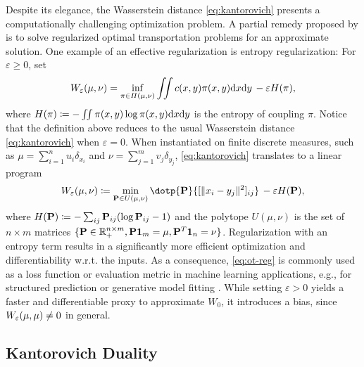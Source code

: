 Despite its elegance, the Wasserstein distance \eqref{eq:kantorovich} presents a computationally challenging optimization problem. A partial remedy proposed by \citet{cuturi2013sinkhorn} is to solve regularized optimal transportation problems for an approximate solution. One example of an effective regularization is entropy regularization: For $\varepsilon\geq0$, set 
\begin{equation} \label{eq:ot-entropy}
W_{\varepsilon}(\mu,\nu) = \inf_{\pi\in \Pi(\mu,\nu)}\iint c(x, y) \pi(x, y)\mathrm{d}x\mathrm{d}y  \,-\varepsilon H(\pi),
\end{equation}
where $H(\pi) \coloneqq - \iint \pi(x, y)\log\pi(x, y)\mathrm{d}x\mathrm{d}y$ is the entropy of coupling $\pi$. 
Notice that the definition above reduces to the usual Wasserstein distance \eqref{eq:kantorovich} when $\varepsilon=0$.
When instantiated on finite discrete measures, such as $\mu=\sum_{i=1}^n u_i\delta_{x_i}$ and $\nu=\sum_{j=1}^m v_j\delta_{y_j}$, \eqref{eq:kantorovich} translates to a linear program
\begin{equation}\label{eq:ot-reg}
\We(\mu,\nu) \defeq \min_{\bP\in U(\mu,\nu)} \dotp{\bP}{[\|x_i - y_j\|^2]_{ij}}  \,-\varepsilon H(\bP),
\end{equation}
where $H(\mathbf{P}) \coloneqq -\sum_{ij} \mathbf{P}_{ij} (\log \mathbf{P}_{ij} - 1)$ and the polytope $U(\mu,\nu)$ is the set of $n\times m$ matrices $\{\mathbf{P}\in\mathbb{R}^{n \times m}_+, \mathbf{P}\mathbf{1}_m = \mu, \mathbf{P}^T \mathbf{1}_n=\nu\}$.
Regularization with an entropy term results in a significantly more efficient optimization \citep{cuturi2013sinkhorn} and differentiability w.r.t. the inputs.
As a consequence, \ref{eq:ot-reg} is commonly used as a loss function or evaluation metric in machine learning applications, e.g., for structured prediction \citep{frogner2015learning,janati2020multi} or generative model fitting \citep{arjovsky2017wasserstein, salimans2018improving, genevay2018learning}.
While setting $\varepsilon>0$ yields a faster and differentiable proxy to approximate $W_{0}$, it introduces a bias, since $W_{\varepsilon}(\mu,\mu)\ne 0$ in general.

\subsection{Kantorovich Duality} \label{sec:background_dual}

